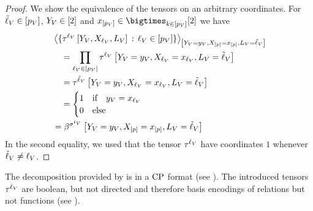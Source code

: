 \begin{proof}
    We show the equivalence of the tensors on an arbitrary coordinates.
    For $\tilde{\ell}_{V}\in[p_{V}]$, $Y_{V}\in[2]$ and $\catindexof{[\seldimof{\vselectionsymbol}]}\in\bigtimes_{\catenumerator\in[\seldimof{\vselectionsymbol}]}[2]$ we have
    \begin{align*}
        & \contractionof{
            \{\selectorcomponentofat{\selindexof{\vselectionsymbol}}{\vselectionheadvar,\catvariableof{\selindexof{\vselectionsymbol}},\selvariableof{\vselectionsymbol}} \wcols \selindexofin{\vselectionsymbol}\}
        }{\indexedheadvariableof{\vselectionsymbol},\indexedcatvariableof{[\seldim]},\selvariableof{\vselectionsymbol} = \tilde{\selindex}_{\vselectionsymbol}} \\
        & \quad =
        \prod_{\selindexofin{\vselectionsymbol}} \selectorcomponentofat{\selindexof{\vselectionsymbol}}{
            \indexedheadvariableof{\vselectionsymbol},\indexedcatvariableof{\selindexof{\vselectionsymbol}},\selvariableof{\vselectionsymbol}=\tilde{\selindex}_{\vselectionsymbol}
        } \\
        & \quad = \selectorcomponentofat{\tilde{\selindex}_{\vselectionsymbol}}{
            \indexedheadvariableof{\vselectionsymbol},\indexedcatvariableof{\selindexof{\vselectionsymbol}},\selvariableof{\vselectionsymbol}=\tilde{\selindex}_{\vselectionsymbol}
        } \\
        & \quad =
        \begin{cases}
            1 & \ifspace \headindexof{\vselectionsymbol} = \catindexof{\selindexof{\vselectionsymbol}} \\
            0 & \text{else}
        \end{cases} \\
        & = \bsencodingofat{\vselectionmap}{\indexedheadvariableof{\vselectionsymbol},\indexedcatvariableof{[\seldim]},\selvariableof{\vselectionsymbol}=\tilde{\selindex}_{\vselectionsymbol}}
    \end{align*}
    In the second equality, we used that the tensor $\tau^{{\ell_{V}}}$ have coordinates $1$ whenever $\tilde{\ell}_{V}\neq\ell_{V}$.
\end{proof}

The decomposition provided by  is in a $\mathrm{CP}$ format (see ).
The introduced tensors $\tau^{{\ell_{V}}}$ are boolean, but not directed and therefore basis encodings of relations but not functions (see ).

